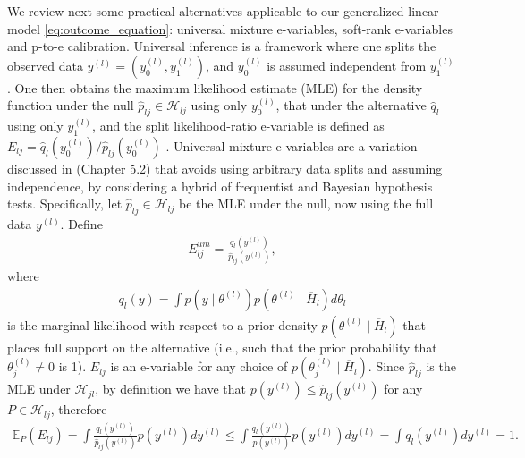 \documentclass[pdflatex,sn-mathphys-num]{sn-jnl}%
\theoremstyle{thmstyleone}%
\theoremstyle{thmstyletwo}%
\theoremstyle{thmstylethree}%
\begin{document}
We review next some practical alternatives applicable to our generalized linear model \eqref{eq:outcome_equation}:
universal mixture e-variables, soft-rank e-variables and p-to-e calibration.
Universal inference \citep{wasserman:2020} is a framework  %
where one splits the observed data $y^{(l)}=(y_0^{(l)},y_1^{(l)})$, and $y_0^{(l)}$ is assumed independent from $y_1^{(l)}$. One then obtains the maximum likelihood estimate (MLE) for the density function under the null $\hat{p}_{lj} \in \mathcal{H}_{lj}$ using only $y_0^{(l)}$, that under the alternative $\hat{q}_l$ using only $y_1^{(l)}$, and the split likelihood-ratio e-variable is defined as $E_{lj}= \hat{q}_l(y_0^{(l)}) / \hat{p}_{lj}(y_0^{(l)})$ \citep{ramdas:2026}.
Universal mixture e-variables are a variation discussed in \cite{ramdas:2025} (Chapter 5.2) that avoids using arbitrary data splits and assuming independence, by considering a hybrid of frequentist and Bayesian hypothesis tests.
Specifically, let $\hat{p}_{lj} \in \mathcal{H}_{lj}$ be the MLE under the null, now using the full data $y^{(l)}$. Define
\begin{align}
E^{um}_{lj}= \frac{q_l(y^{(l)})}{\hat{p}_{lj}(y^{(l)})},
\label{eq:univ_evalue_mixture}
\end{align}
where
\begin{align}
 q_l(y)= \int p(y \mid \theta^{(l)}) p(\theta^{(l)} \mid \overline{H}_l) d\theta_l
\nonumber
\end{align}
is the marginal likelihood with respect to a prior density $p(\theta^{(l)} \mid \overline{H}_l)$ that places full support on the alternative %
(i.e., such that the prior probability that $\theta_j^{(l)} \neq 0$ is 1).
$E_{lj}$ is an e-variable for any choice of $p(\theta_j^{(l)} \mid \overline{H}_l)$.
Since $\hat{p}_{lj}$ is the MLE under $\mathcal{H}_{jl}$, by definition we have that $p(y^{(l)}) \leq \hat{p}_{lj}(y^{(l)})$ for any $P \in \mathcal{H}_{lj}$, therefore
\begin{align}
 \mathbb E_{P} \left( E_{lj} \right)=
\int \frac{q_l(y^{(l)})}{\hat{p}_{lj}(y^{(l)})} p(y^{(l)}) dy^{(l)}
\leq \int \frac{q_l(y^{(l)})}{p(y^{(l)})} p(y^{(l)}) dy^{(l)}= \int q_l(y^{(l)}) dy^{(l)}= 1.
\nonumber
\end{align}
\end{document}
